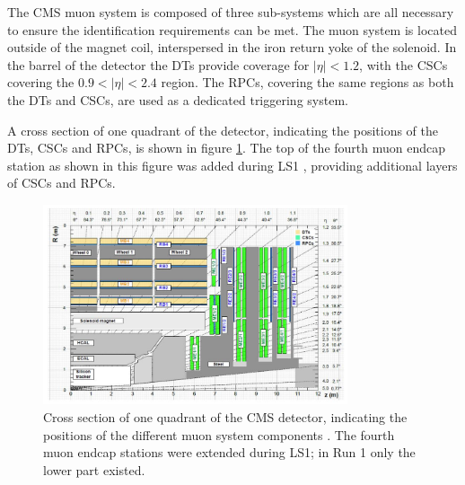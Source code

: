 The \ac{CMS} muon system \cite{cms-jinst} is composed of three sub-systems which
are all necessary to ensure the identification requirements can be met. The muon system is located
outside of the magnet coil, interspersed in the iron return yoke of the solenoid.
In the barrel of the detector the \ac{DTs} provide coverage for $|\eta|<1.2$, with
the \ac{CSCs} covering the $0.9<|\eta|<2.4$ region. The \ac{RPCs}, covering the same
regions as both the \ac{DTs} and \ac{CSCs}, are used as a dedicated triggering system.

A cross section of one quadrant of the detector, indicating
the positions of the \ac{DTs}, \ac{CSCs} and \ac{RPCs}, is shown in figure \ref{fig:CMS_MuonSystem}.
The top of the fourth muon endcap station as shown in this figure was added during \ac{LS1} \cite{cms-muon-upgrade}, providing
additional layers of \ac{CSCs} and \ac{RPCs}.
\begin{figure}[h!]
\begin{center}
\includegraphics[width=0.8\textwidth]{./Detector/Plots/MuonSystemUpgrade.png}
\caption[Cross section of one quadrant of the CMS detector,
indicating the positions of the different muon system components.]{Cross section of one quadrant of the CMS detector, indicating
the positions of the different muon system components \cite{cms-muon-upgrade}. The 
fourth muon endcap stations were extended during \ac{LS1}; in Run 1 only the lower
part existed.}
\label{fig:CMS_MuonSystem}
\end{center}
\end{figure}

